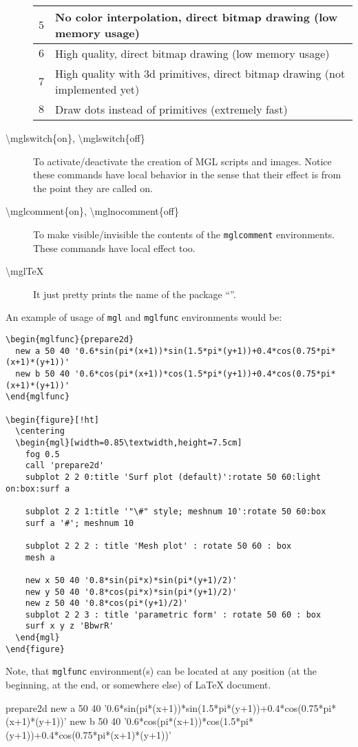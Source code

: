 \documentclass{article}
\begin{document}
\begin{description}
\begin{center}
\begin{tabular}{cl}
      \hline
      $5$ & No color interpolation, direct bitmap drawing (low memory usage)\\
      \hline
      $6$ & High quality, direct bitmap drawing (low memory usage)\\
      \hline
      $7$ & High quality with 3d primitives, direct bitmap drawing (not implemented yet)\\
      \hline
      $8$ & Draw dots instead of primitives (extremely fast)\\
      \hline
    \end{tabular}
  \end{center}
\item[\textbackslash{}mglswitch\{on\}, \textbackslash{}mglswitch\{off\}]
  To activate/deactivate the creation of MGL scripts and images. Notice these commands have local behavior in the sense that their effect is from the point they are called on.
\item[\textbackslash{}mglcomment\{on\}, \textbackslash{}mglnocomment\{off\}]
  To make visible/invisible the contents of the \texttt{mglcomment} environments. These commands have local effect too.
\item[\textbackslash{}mglTeX]
	It just pretty prints the name of the package ``\mglTeX''.
\end{description}


An example of usage of \texttt{mgl} and \texttt{mglfunc} environments would be:
\begin{verbatim}
\begin{mglfunc}{prepare2d}
  new a 50 40 '0.6*sin(pi*(x+1))*sin(1.5*pi*(y+1))+0.4*cos(0.75*pi*(x+1)*(y+1))'
  new b 50 40 '0.6*cos(pi*(x+1))*cos(1.5*pi*(y+1))+0.4*cos(0.75*pi*(x+1)*(y+1))'
\end{mglfunc}

\begin{figure}[!ht]
  \centering
  \begin{mgl}[width=0.85\textwidth,height=7.5cm]
    fog 0.5
    call 'prepare2d'
    subplot 2 2 0:title 'Surf plot (default)':rotate 50 60:light on:box:surf a

    subplot 2 2 1:title '"\#" style; meshnum 10':rotate 50 60:box
    surf a '#'; meshnum 10

    subplot 2 2 2 : title 'Mesh plot' : rotate 50 60 : box
    mesh a

    new x 50 40 '0.8*sin(pi*x)*sin(pi*(y+1)/2)'
    new y 50 40 '0.8*cos(pi*x)*sin(pi*(y+1)/2)'
    new z 50 40 '0.8*cos(pi*(y+1)/2)'
    subplot 2 2 3 : title 'parametric form' : rotate 50 60 : box
    surf x y z 'BbwrR'
  \end{mgl}
\end{figure}
\end{verbatim}
Note, that \texttt{mglfunc} environment(s) can be located at any position (at the beginning, at the end, or somewhere else) of LaTeX document.
\begin{mglfunc}{prepare2d}
  new a 50 40 '0.6*sin(pi*(x+1))*sin(1.5*pi*(y+1))+0.4*cos(0.75*pi*(x+1)*(y+1))'
  new b 50 40 '0.6*cos(pi*(x+1))*cos(1.5*pi*(y+1))+0.4*cos(0.75*pi*(x+1)*(y+1))'
\end{mglfunc}
\end{document}

